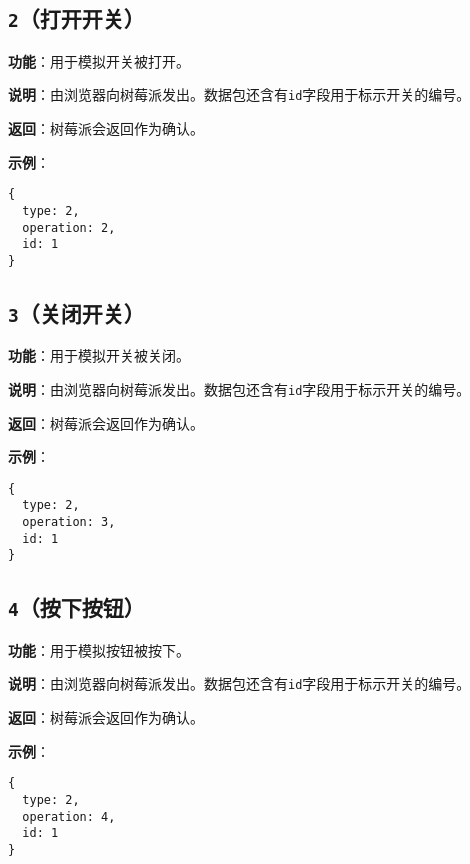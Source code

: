 \documentclass{article}
\begin{document}
\subsection{\texttt{2}（打开开关）}
\label{op:switch_on}

\noindent\textbf{功能}：用于模拟开关被打开。

\noindent\textbf{说明}：由浏览器向树莓派发出。数据包还含有\texttt{id}字段用于标示开关的编号。

\noindent\textbf{返回}：树莓派会返回\texttt{}作为确认。

\noindent\textbf{示例}：

\begin{lstlisting}[style=json]
{
  type: 2,
  operation: 2,
  id: 1
}
\end{lstlisting}

\subsection{\texttt{3}（关闭开关）}
\label{op:switch_off}

\noindent\textbf{功能}：用于模拟开关被关闭。

\noindent\textbf{说明}：由浏览器向树莓派发出。数据包还含有\texttt{id}字段用于标示开关的编号。

\noindent\textbf{返回}：树莓派会返回\texttt{}作为确认。

\noindent\textbf{示例}：

\begin{lstlisting}[style=json]
{
  type: 2,
  operation: 3,
  id: 1
}
\end{lstlisting}

\subsection{\texttt{4}（按下按钮）}
\label{op:press_button}

\noindent\textbf{功能}：用于模拟按钮被按下。

\noindent\textbf{说明}：由浏览器向树莓派发出。数据包还含有\texttt{id}字段用于标示开关的编号。

\noindent\textbf{返回}：树莓派会返回\texttt{}作为确认。

\noindent\textbf{示例}：

\begin{lstlisting}[style=json]
{
  type: 2,
  operation: 4,
  id: 1
}
\end{lstlisting}
\end{document}
